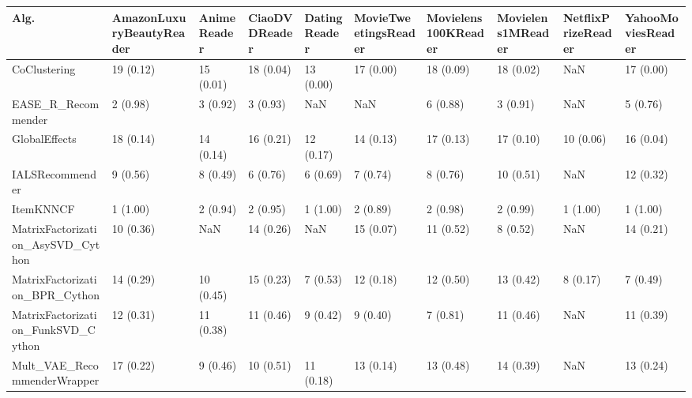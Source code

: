 \begin{tabular}{llllllllll}
\toprule
                               Alg. & AmazonLuxuryBeautyReader & AnimeReader & CiaoDVDReader & DatingReader & MovieTweetingsReader & Movielens100KReader & Movielens1MReader & NetflixPrizeReader & YahooMoviesReader \\
\midrule
                       CoClustering &                19 (0.12) &   15 (0.01) &     18 (0.04) &    13 (0.00) &            17 (0.00) &           18 (0.09) &         18 (0.02) &                NaN &         17 (0.00) \\
                 EASE\_R\_Recommender &                 2 (0.98) &    3 (0.92) &      3 (0.93) &          NaN &                  NaN &            6 (0.88) &          3 (0.91) &                NaN &          5 (0.76) \\
                      GlobalEffects &                18 (0.14) &   14 (0.14) &     16 (0.21) &    12 (0.17) &            14 (0.13) &           17 (0.13) &         17 (0.10) &          10 (0.06) &         16 (0.04) \\
                    IALSRecommender &                 9 (0.56) &    8 (0.49) &      6 (0.76) &     6 (0.69) &             7 (0.74) &            8 (0.76) &         10 (0.51) &                NaN &         12 (0.32) \\
                          ItemKNNCF &                 1 (1.00) &    2 (0.94) &      2 (0.95) &     1 (1.00) &             2 (0.89) &            2 (0.98) &          2 (0.99) &           1 (1.00) &          1 (1.00) \\
  MatrixFactorization\_AsySVD\_Cython &                10 (0.36) &         NaN &     14 (0.26) &          NaN &            15 (0.07) &           11 (0.52) &          8 (0.52) &                NaN &         14 (0.21) \\
     MatrixFactorization\_BPR\_Cython &                14 (0.29) &   10 (0.45) &     15 (0.23) &     7 (0.53) &            12 (0.18) &           12 (0.50) &         13 (0.42) &           8 (0.17) &          7 (0.49) \\
 MatrixFactorization\_FunkSVD\_Cython &                12 (0.31) &   11 (0.38) &     11 (0.46) &     9 (0.42) &             9 (0.40) &            7 (0.81) &         11 (0.46) &                NaN &         11 (0.39) \\
        Mult\_VAE\_RecommenderWrapper &                17 (0.22) &    9 (0.46) &     10 (0.51) &    11 (0.18) &            13 (0.14) &           13 (0.48) &         14 (0.39) &                NaN &         13 (0.24) \\

\end{tabular}
